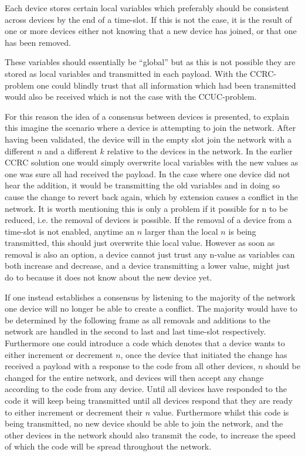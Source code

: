 Each device stores certain local variables which preferably should be consistent across devices by the end of a time-slot.
If this is not the case, it is the result of one or more devices either not knowing that a new device has joined, or that one has been removed.

These variables should essentially be ``global'' but as this is not possible they are stored as local variables and transmitted in each payload.
With the CCRC-problem one could blindly trust that all information which had been transmitted would also be received which is not the case with the CCUC-problem.

\bigskip \noindent
For this reason the idea of a consensus between devices is presented, to explain this imagine the scenario where a device is attempting to join the network.
After having been validated, the device will in the empty slot join the network with a different $n$ and a different $k$ relative to the devices in the network.
In the earlier CCRC solution one would simply overwrite local variables with the new values as one was sure all had received the payload.
In the case where one device did not hear the addition, it would be transmitting the old variables and in doing so cause the change to revert back again, which by extension causes a conflict in the network.
It is worth mentioning this is only a problem if it possible for n to be reduced, i.e. the removal of devices is possible.
If the removal of a device from a time-slot is not enabled, anytime an $n$ larger than the local $n$ is being transmitted, this should just overwrite thie local value. 
However as soon as removal is also an option, a device cannot just trust any n-value as variables can both increase and decrease, and a device transmitting a lower value, might just do to because it does not know about the new device yet.

If one instead establishes a consensus by listening to the majority of the network one device will no longer be able to create a conflict.
The majority would have to be determined by the following frame as all removals and additions to the network are handled in the second to last and last time-slot respectively.
Furthermore one could introduce a code which denotes that a device wants to either increment or decrement $n$, once the device that initiated the change has received a payload with a response to the code from all other devices, $n$ should be changed for the entire network, and devices will then accept any change according to the code from any device.
Until all devices have responded to the code it will keep being transmitted until all devices respond that they are ready to either increment or decrement their $n$ value.
Furthermore whilst this code is being transmitted, no new device should be able to join the network, and the other devices in the network should also transmit the code, to increase the speed of which the code will be spread throughout the network.
